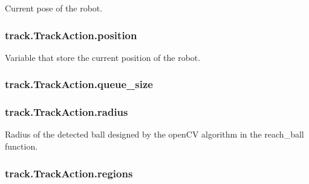 Current pose of the robot. 

\subsubsection[{\texorpdfstring{position}{position}}]{\setlength{\rightskip}{0pt plus 5cm}track.\+Track\+Action.\+position\hspace{0.3cm}{\ttfamily [static]}}\hypertarget{classtrack_1_1TrackAction_af8f5740ee3298f2c093006fe1314a268}{}\label{classtrack_1_1TrackAction_af8f5740ee3298f2c093006fe1314a268}


Variable that store the current position of the robot. 

\subsubsection[{\texorpdfstring{queue\+\_\+size}{queue_size}}]{\setlength{\rightskip}{0pt plus 5cm}track.\+Track\+Action.\+queue\+\_\+size\hspace{0.3cm}{\ttfamily [static]}}\hypertarget{classtrack_1_1TrackAction_a47112fa77bb24c45494449d781bd35c4}{}\label{classtrack_1_1TrackAction_a47112fa77bb24c45494449d781bd35c4}
\subsubsection[{\texorpdfstring{radius}{radius}}]{\setlength{\rightskip}{0pt plus 5cm}track.\+Track\+Action.\+radius\hspace{0.3cm}{\ttfamily [static]}}\hypertarget{classtrack_1_1TrackAction_a0773416696b3fd6ed1dff306eb26c84a}{}\label{classtrack_1_1TrackAction_a0773416696b3fd6ed1dff306eb26c84a}


Radius of the detected ball designed by the open\+CV algorithm in the reach\+\_\+ball function. 

\subsubsection[{\texorpdfstring{regions}{regions}}]{\setlength{\rightskip}{0pt plus 5cm}track.\+Track\+Action.\+regions\hspace{0.3cm}{\ttfamily [static]}}\hypertarget{classtrack_1_1TrackAction_aca76f9e5333f65cf2da37f2b90d5f193}{}\label{classtrack_1_1TrackAction_aca76f9e5333f65cf2da37f2b90d5f193}


